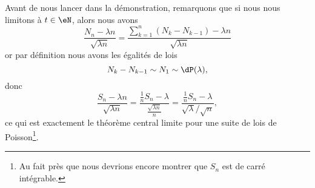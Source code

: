 \begin{remark}
	Avant de nous lancer dans la démonstration, remarquons que si nous nous limitons à \( t\in \eN\), alors nous avons
	\begin{equation}
		\frac{ N_n-\lambda n }{ \sqrt{\lambda n} }=\frac{ \sum_{k=1}^n(N_k-N_{k-1})-\lambda n }{ \sqrt{\lambda n} }
	\end{equation}
	or par définition nous avons les égalités de lois
	\begin{equation}
		N_k-N_{k-1}\sim N_1\sim \dP(\lambda),
	\end{equation}
	donc
	\begin{equation}
		\frac{ S_n-\lambda n }{ \sqrt{\lambda n} }=\frac{ \frac{1}{ n }S_n-\lambda }{ \frac{ \sqrt{\lambda n} }{ n } }=\frac{ \frac{1}{ n }S_n-\lambda }{ \sqrt{\lambda}/\sqrt{n} },
	\end{equation}
	ce qui est exactement le théorème central limite pour une suite de lois de Poisson\footnote{Au fait près que nous devrions encore montrer que \( S_n\) est de carré intégrable.}.
\end{remark}


